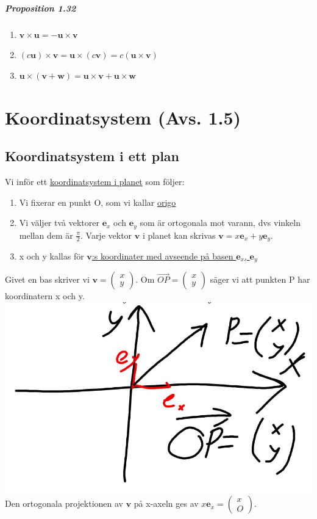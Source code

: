 \paragraph{Proposition 1.32}
\begin{enumerate}
    \item $\bm{v}\times \bm{u} = - \bm{u}\times \bm{v}$
    \item $(c\bm{u})\times \bm{v} = \bm{u}\times (c\bm{v})=c(\bm{u}\times\bm{v})$
    \item $\bm{u}\times (\bm{v}+\bm{w})=\bm{u}\times \bm{v}+\bm{u}\times \bm{w}$
\end{enumerate}

\chapter{Koordinatsystem (Avs. 1.5)}

\section{Koordinatsystem i ett plan}
Vi inför ett \underline{koordinatsystem i planet} som följer:
\begin{enumerate}
    \item Vi fixerar en punkt O, som vi kallar \underline{origo}
    \item Vi väljer två vektorer $\bm{e}_{x}$ och $\bm{e}_{y}$
    som är ortogonala mot varann, dvs vinkeln mellan dem är $\frac{\pi}{2}$. Varje vektor $\bm{v}$ i planet kan skrivas $\bm{v}=x\bm{e}_{x} + y\bm{e}_{y}$.
    \item x och y kallas för \underline{$\bm{v}$:s koordinater med avseende på basen $\bm{e}_{x}$, $\bm{e}_{y}$}
\end{enumerate}
Givet en bas skriver vi $\bm{v}= \begin{pmatrix}x\\y\end{pmatrix}$. 
Om $\overrightarrow{OP}=\begin{pmatrix}x\\y\end{pmatrix}$ säger vi att punkten P har koordinatern x och y.\\
\includegraphics[scale=0.25]{imgs/22-01-24img01.jpg}\\
Den ortogonala projektionen av $\bm{v}$ på x-axeln ges av $x\bm{e}_{x}=\begin{pmatrix}x\\O\end{pmatrix}$.
\clearpage
